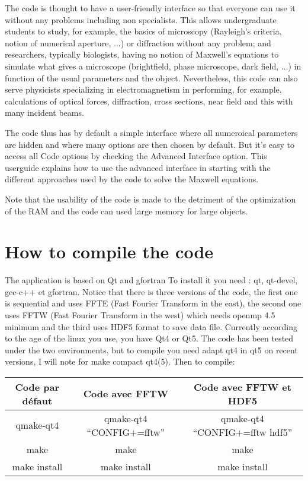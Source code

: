 The code is thought to have a user-friendly interface so that everyone
can use it without any problems including non specialists. This allows
undergraduate students to study, for example, the basics of microscopy
(Rayleigh's criteria, notion of numerical aperture, ...)  or
diffraction without any problem; and researchers, typically
biologists, having no notion of Maxwell's equations to simulate what
gives a microscope (brightfield, phase microscope, dark field, ...) in
function of the usual parameters and the object. Nevertheless, this
code can also serve physicists specializing in electromagnetism in
performing, for example, calculations of optical forces, diffraction,
cross sections, near field and this with many incident beams.

The code thus has by default a simple interface where all numeroical
parameters are hidden and where many options are then chosen by
default. But it's easy to access all Code options by checking the
Advanced Interface option. This userguide explains how to use the
advanced interface in starting with the different approaches used by
the code to solve the Maxwell equations.

Note that the usability of the code is made to the detriment of the
optimization of the RAM and the code can used large memory for large
objects.


\section{How to compile the code}

The application is based on Qt and gfortran To install it you need :
qt, qt-devel, gcc-c++ et gfortran.  Notice that there is three
versions of the code, the first one is sequential and uses FFTE (Fast
Fourier Transform in the east), the second one uses FFTW (Fast Fourier
Transform in the west) which needs openmp 4.5 minimum and the third
uses HDF5 format to save data file. Currently according to the age of
the linux you use, you have Qt4 or Qt5. The code has been tested under
the two environments, but to compile you need adapt qt4 in qt5 on
recent versions, I will note for make compact qt4(5). Then to compile:

\begin{tabular}{|c|c|c|}
  \hline
  Code par défaut & Code avec FFTW & Code avec FFTW et HDF5 \\
  \hline
  qmake-qt4 & qmake-qt4 ``CONFIG+=fftw'' & qmake-qt4 ``CONFIG+=fftw hdf5'' \\
  make & make & make \\
make install & make install & make install \\
  \hline
\end{tabular}

